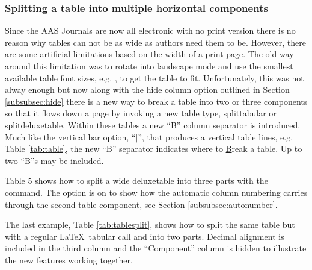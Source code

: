 \documentclass{aastex62}
\newcommand\latex{La\TeX}
\begin{document}
\subsubsection{Splitting a table into multiple horizontal components}

Since the AAS Journals are now all electronic with no print version there is
no reason why tables can not be as wide as authors need them to be.
However, there are some artificial limitations based on the width of a
print page.  The old way around this limitation was to rotate into 
landscape mode and use the smallest available table font
sizes, e.g. {\tt\string\tablewidth}, to get the table to fit.
Unfortunately, this was not alway enough but now along with the hide column
option outlined in Section \ref{subsubsec:hide} there is a new way to break
a table into two or three components so that it flows down a page by
invoking a new table type, splittabular or splitdeluxetable. Within these
tables a new ``B'' column separator is introduced.  Much like the vertical
bar option, ``$\vert$'', that produces a vertical table lines, e.g. Table
\ref{tab:table}, the new ``B'' separator indicates where to \underline{B}reak
a table.  Up to two ``B''s may be included.

Table 5 %
shows how to split a wide deluxetable into three parts with
the {\tt\string\splitdeluxetable} command.  The {\tt\string\colnumbers}
option is on to show how the automatic column numbering carries through the
second table component, see Section \ref{subsubsec:autonumber}.

The last example, Table \ref{tab:tablesplit}, shows how to split the same
table but with a regular \latex\ tabular call and into two parts. Decimal
alignment is included in the third column and the ``Component'' column is
hidden to illustrate the new features working together.
\end{document}

